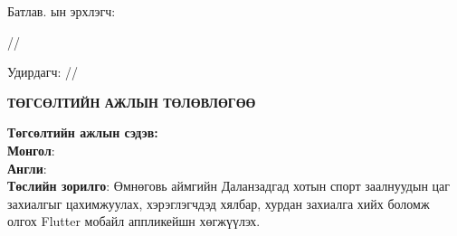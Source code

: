 
\begin{titlepage}
	\noindent Батлав. \deptname ын эрхлэгч:
	\begin{flushright}
		\makebox[6cm]{\dotfill} /\chairname/
	\end{flushright}
	Удирдагч:\makebox[6cm]{ \dotfill} /\supname/
	\begin{center}
		\vspace*{0.5cm}
		\textbf{{\large ТӨГСӨЛТИЙН АЖЛЫН ТӨЛӨВЛӨГӨӨ}}\\[0.5cm]
	\end{center}
	\noindent \textbf{Төгсөлтийн ажлын сэдэв:}\\
	\textbf{Монгол}: \ttitle\\
	\textbf{Англи}: \ttitleng\\

	\noindent \textbf{Төслийн зорилго}: Өмнөговь аймгийн Даланзадгад хотын спорт заалнуудын цаг захиалгыг цахимжуулах, хэрэглэгчдэд хялбар, хурдан захиалга хийх боломж олгох Flutter мобайл аппликейшн хөгжүүлэх.\\


\end{titlepage}
